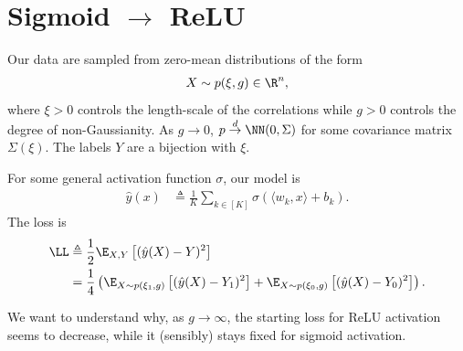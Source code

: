 \documentclass{article}
\begin{document}














\newpage
\section{Sigmoid $\to$ ReLU}
Our data are sampled from zero-mean distributions of the form
\begin{align}
  X \sim p(\xi, g) \in \R^n,
\end{align}
where $\xi > 0$ controls the length-scale of the correlations while $g > 0$ controls the degree of non-Gaussianity.
As $g \to 0$, $p \overset{d}{\to} \NN(0, \Sigma)$ for some covariance matrix $\Sigma(\xi)$.
The labels $Y$ are a bijection with $\xi$.

For some general activation function $\sigma$, our model is
\begin{align}
  \hat{y}(x) &\triangleq \frac{1}{K} \sum_{k\in[K]} \sigma( \langle w_k, x \rangle + b_k ).
\end{align}
The loss is
\begin{align}
  \LL &\triangleq \frac{1}{2} \E_{X, Y} \left[ ( \hat{y}(X) - Y )^2 \right] \\
  &= \frac{1}{4} \left( \E_{X \sim p(\xi_1, g)} \left[ (\hat{y}(X) - Y_1)^2 \right] + \E_{X \sim p(\xi_0, g)} \left[ (\hat{y}(X) - Y_0)^2 \right] \right).
\end{align}

We want to understand why, as $g \to \infty$, the starting loss for ReLU activation seems to decrease, while it (sensibly) stays fixed for sigmoid activation.
\end{document}
